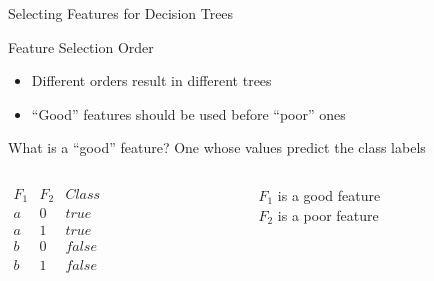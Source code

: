 \documentclass[14pt]{beamer}
\begin{document}
\begin{frame}{Selecting Features for Decision Trees}
\begin{block}{Feature Selection Order}
\begin{itemize}
\item Different orders result in different trees
\item ``Good'' features should be used before ``poor'' ones
\end{itemize}
\end{block}
\pause
\begin{block}{What is a ``good'' feature?}
One whose values predict the class labels \\
\end{block}
\pause
\medskip
\begin{columns}
\begin{column}{1.2in}
$
\begin{array}{lll}
F_1 & F_2 & \textit{Class} \\
\hline
a & 0 & \textit{true} \\
a & 1 & \textit{true} \\
b & 0 & \textit{false} \\
b & 1 & \textit{false} \\
\end{array}
$
\end{column}
\pause
\begin{column}{1.8in}
$F_1$ is a \alert{good} feature \\
\bigskip
$F_2$ is a \alert{poor} feature
\end{column}
\end{columns}
\end{frame}
\end{document}
